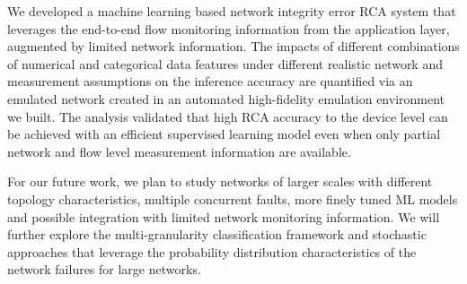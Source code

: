 We developed a machine learning based network integrity error RCA system that leverages the end-to-end flow monitoring information 
from the application layer, augmented by limited network information. The impacts of different combinations of numerical and categorical data 
features under different realistic network and measurement assumptions on the inference accuracy are quantified via an emulated network created 
in an automated high-fidelity emulation environment we built. The analysis validated that high RCA accuracy to the device level can be achieved with an efficient supervised 
learning model even when only partial network and flow level measurement information are available.

For our future work, we plan to study networks of larger scales with different topology characteristics, multiple concurrent faults, more finely tuned ML models and possible integration with limited network monitoring information.
We will further explore the multi-granularity classification framework and stochastic approaches that leverage the probability distribution characteristics of the network failures for large networks.
